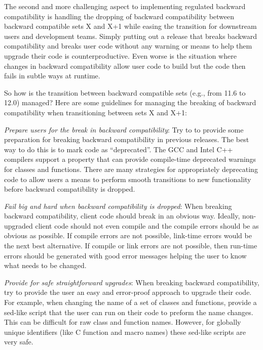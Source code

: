 \documentclass[11pt]{SANDreport}
\begin{document}
The second and more challenging aspect to implementing regulated
backward compatibility is handling the dropping of backward
compatibility between backward compatible sets X and X+1 while easing
the transition for downstream users and development teams.  Simply
putting out a release that breaks backward compatibility and breaks
user code without any warning or means to help them upgrade their code
is counterproductive.  Even worse is the situation where changes in
backward compatibility allow user code to build but the code then fails in
subtle ways at runtime.

So how is the transition between backward compatible sets (e.g., from
11.6 to 12.0) managed?  Here are some guidelines for managing the
breaking of backward compatibility when transitioning between sets X and X+1:

\begin{compactitem}

{}\item\textit{Prepare users for the break in backward compatibility}:
Try to to provide some preparation for breaking backward compatibility
in previous releases.  The best way to do this is to mark code as
``deprecated''.  The GCC and Intel C++ compilers support a
{} property that can provide compile-time
deprecated warnings for classes and functions.  There are many
strategies for appropriately deprecating code to allow users a means
to perform smooth transitions to new functionality before backward
compatibility is dropped.

{}\item\textit{Fail big and hard when backward compatibility is
dropped}: When breaking backward compatibility, client code should
break in an obvious way.  Ideally, non-upgraded client code should not
even compile and the compile errors should be as obvious as possible.
If compile errors are not possible, link-time errors would be the next
best alternative.  If compile or link errors are not possible, then
run-time errors should be generated with good error messages helping
the user to know what needs to be changed.

{}\item\textit{Provide for safe straightforward upgrades}: When
breaking backward compatibility, try to provide the user an easy and
error-proof approach to upgrade their code.  For example, when
changing the name of a set of classes and functions, provide a
sed-like script that the user can run on their code to preform the
name changes.  This can be difficult for raw class and function names.
However, for globally unique identifiers (like C function and macro
names) these sed-like scripts are very safe.

\end{compactitem}
\end{document}

